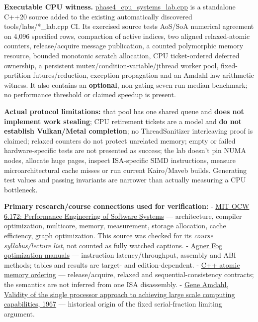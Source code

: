 \textbf{Executable CPU witness.} \hyperref[source-file-0060a91bd24dd25d6c14e679]{phase4\_cpu\_systems\_lab.cpp} is a standalone C++20 source added to the existing automatically discovered tools/labs/*\_lab.cpp CI. Its exercised source tests AoS/SoA numerical agreement on 4,096 specified rows, compaction of active indices, two aligned relaxed-atomic counters, release/acquire message publication, a counted polymorphic memory resource, bounded monotonic scratch allocation, CPU ticket-ordered deferred ownership, a persistent mutex/condition-variable/jthread worker pool, fixed-partition futures/reduction, exception propagation and an Amdahl-law arithmetic witness. It also contains an \textbf{optional}, non-gating seven-run median benchmark; no performance threshold or claimed speedup is present.

\textbf{Actual protocol limitations:} that pool has one shared queue and \textbf{does not implement work stealing}; CPU retirement tickets are a model and \textbf{do not establish Vulkan/Metal completion}; no ThreadSanitizer interleaving proof is claimed; relaxed counters do not protect unrelated memory; empty or failed hardware-specific tests are not presented as success; the lab doesn't pin NUMA nodes, allocate huge pages, inspect ISA-specific SIMD instructions, measure microarchitectural cache misses or run current Kairo/Maveb builds. Generating test values and passing invariants are narrower than actually measuring a CPU bottleneck.

\textbf{Primary research/course connections used for verification:} - \href{https://ocw.mit.edu/courses/6-172-performance-engineering-of-software-systems-fall-2018/video_galleries/lecture-videos/}{MIT OCW 6.172: Performance Engineering of Software Systems} --- architecture, compiler optimization, multicore, memory, measurement, storage allocation, cache efficiency, graph optimization. This source was checked for its \emph{course syllabus/lecture list}, not counted as fully watched captions. - \href{https://www.agner.org/optimize/}{Agner Fog optimization manuals} --- instruction latency/throughput, assembly and ABI methods; tables and results are target- and edition-dependent. - \href{https://en.cppreference.com/w/cpp/atomic/memory_order}{C++ atomic memory ordering} --- release/acquire, relaxed and sequential-consistency contracts; the semantics are not inferred from one ISA disassembly. - \href{https://doi.org/10.1145/1465482.1465560}{Gene Amdahl, Validity of the single processor approach to achieving large scale computing capabilities, 1967} --- historical origin of the fixed serial-fraction limiting argument.

